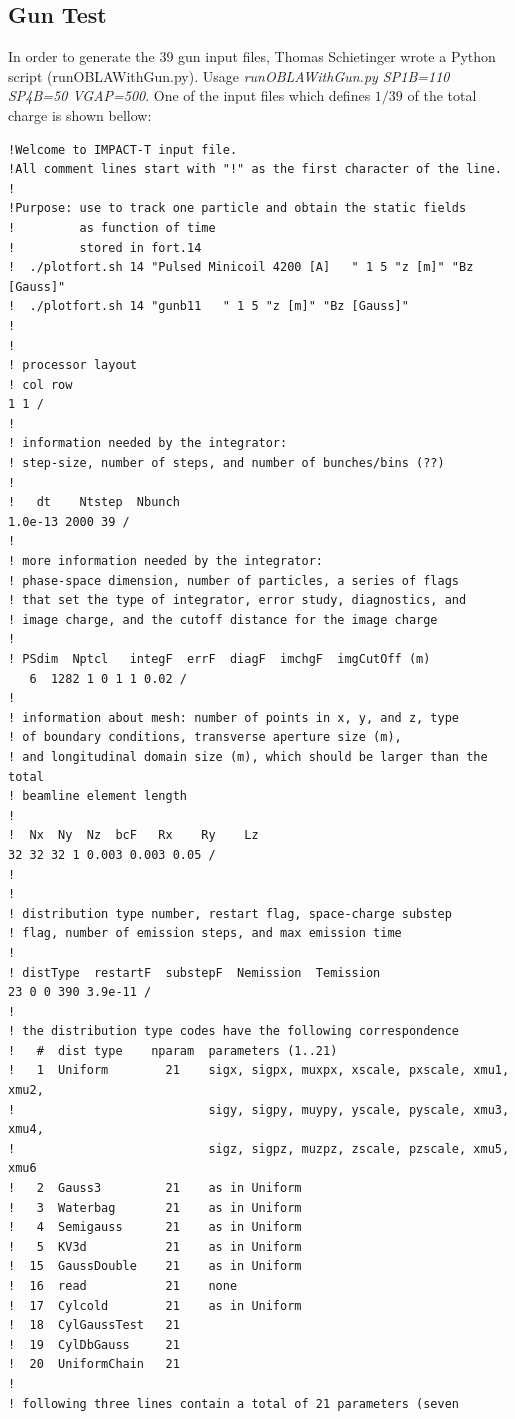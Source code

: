 \documentclass{psi-note}    %
\begin{document}
{\subsection{Gun Test}
In order to generate the 39 gun input files, Thomas Schietinger wrote a Python
script (runOBLAWithGun.py). Usage {\it runOBLAWithGun.py SP1B=110 SP4B=50
VGAP=500}.
One of the input files which defines $1/39$ of the total charge is shown bellow: 
\begin{verbatim}
!Welcome to IMPACT-T input file.
!All comment lines start with "!" as the first character of the line.
!
!Purpose: use to track one particle and obtain the static fields 
!         as function of time
!         stored in fort.14
!  ./plotfort.sh 14 "Pulsed Minicoil 4200 [A]   " 1 5 "z [m]" "Bz [Gauss]"
!  ./plotfort.sh 14 "gunb11   " 1 5 "z [m]" "Bz [Gauss]"  
!
!
! processor layout
! col row
1 1 /
!
! information needed by the integrator:
! step-size, number of steps, and number of bunches/bins (??)
!
!   dt    Ntstep  Nbunch
1.0e-13 2000 39 /
!
! more information needed by the integrator:
! phase-space dimension, number of particles, a series of flags
! that set the type of integrator, error study, diagnostics, and
! image charge, and the cutoff distance for the image charge
!
! PSdim  Nptcl   integF  errF  diagF  imchgF  imgCutOff (m)
   6  1282 1 0 1 1 0.02 /
!
! information about mesh: number of points in x, y, and z, type
! of boundary conditions, transverse aperture size (m), 
! and longitudinal domain size (m), which should be larger than the total
! beamline element length
!
!  Nx  Ny  Nz  bcF   Rx    Ry    Lz
32 32 32 1 0.003 0.003 0.05 /
!
!
! distribution type number, restart flag, space-charge substep
! flag, number of emission steps, and max emission time
!
! distType  restartF  substepF  Nemission  Temission
23 0 0 390 3.9e-11 /
!
! the distribution type codes have the following correspondence
!   #  dist type    nparam  parameters (1..21)
!   1  Uniform        21    sigx, sigpx, muxpx, xscale, pxscale, xmu1, xmu2,
!                           sigy, sigpy, muypy, yscale, pyscale, xmu3, xmu4,
!                           sigz, sigpz, muzpz, zscale, pzscale, xmu5, xmu6
!   2  Gauss3         21    as in Uniform
!   3  Waterbag       21    as in Uniform
!   4  Semigauss      21    as in Uniform
!   5  KV3d           21    as in Uniform
!  15  GaussDouble    21    as in Uniform
!  16  read           21    none
!  17  Cylcold        21    as in Uniform
!  18  CylGaussTest   21   
!  19  CylDbGauss     21   
!  20  UniformChain   21   
!
! following three lines contain a total of 21 parameters (seven

\end{verbatim}}
\end{document}
